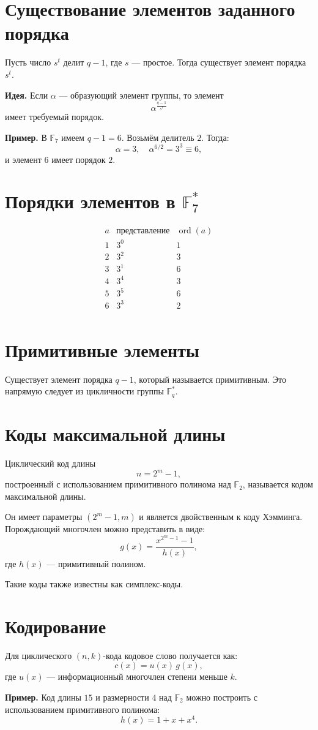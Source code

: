 \documentclass[a4paper,12pt]{article}
\begin{document}
\section*{Существование элементов заданного порядка}

Пусть число $s^t$ делит $q-1$, где $s$ — простое. Тогда существует элемент порядка $s^t$.

\textbf{Идея.} Если $\alpha$ — образующий элемент группы, то элемент
\[
\alpha^{\frac{q-1}{s^t}}
\]
имеет требуемый порядок.

\textbf{Пример.} В $\mathbb{F}_7$ имеем $q-1=6$. Возьмём делитель $2$. Тогда:
\[
\alpha = 3,\quad \alpha^{6/2} = 3^3 \equiv 6,
\]
и элемент $6$ имеет порядок $2$.

\section*{Порядки элементов в $\mathbb{F}_7^*$}

\[
\begin{array}{c|c|c}
a & \text{представление} & \operatorname{ord}(a) \\
\hline
1 & 3^0 & 1 \\
2 & 3^2 & 3 \\
3 & 3^1 & 6 \\
4 & 3^4 & 3 \\
5 & 3^5 & 6 \\
6 & 3^3 & 2 \\
\end{array}
\]

\section*{Примитивные элементы}

Существует элемент порядка $q-1$, который называется примитивным. Это напрямую следует из цикличности группы $\mathbb{F}_q^*$.

\section*{Коды максимальной длины}

Циклический код длины
\[
n = 2^m - 1,
\]
построенный с использованием примитивного полинома над $\mathbb{F}_2$, называется кодом максимальной длины.

Он имеет параметры $(2^m - 1, m)$ и является двойственным к коду Хэмминга. Порождающий многочлен можно представить в виде:
\[
g(x) = \frac{x^{2^m - 1} - 1}{h(x)},
\]
где $h(x)$ — примитивный полином.

Такие коды также известны как симплекс-коды.

\section*{Кодирование}

Для циклического $(n,k)$-кода кодовое слово получается как:
\[
c(x) = u(x)\,g(x),
\]
где $u(x)$ — информационный многочлен степени меньше $k$.

\textbf{Пример.} Код длины $15$ и размерности $4$ над $\mathbb{F}_2$ можно построить с использованием примитивного полинома:
\[
h(x) = 1 + x + x^4.
\]
\end{document}
